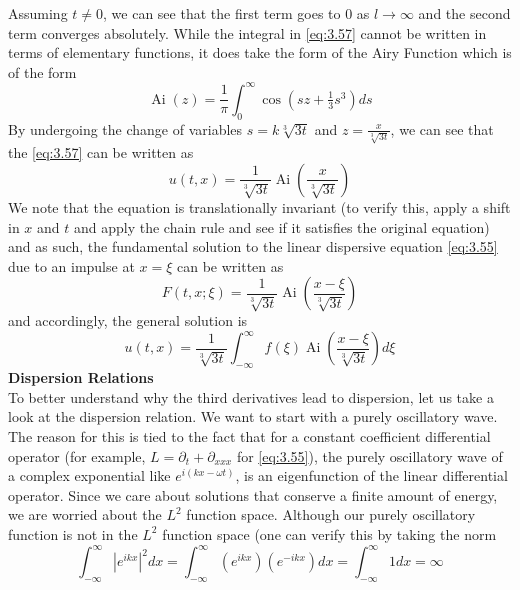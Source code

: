 \documentclass{article}
\numberwithin{equation}{section}
\begin{document}
Assuming $t\neq 0$, we can see that the first term goes to 0 as $l\rightarrow \infty$ and the second term converges absolutely. While the integral in \eqref{eq:3.57} cannot be written in terms of elementary functions, it does take the form of the Airy Function which is of the form
\begin{equation*}
    \operatorname{Ai} (z) = \frac{1}{\pi}\int^\infty_0 \cos(sz+\tfrac{1}{3}s^3)ds
\end{equation*}
By undergoing the change of variables $s=k\sqrt[3]{3t}$ and $z=\frac{x}{\sqrt[3]{3t}}$, we can see that the \eqref{eq:3.57} can be written as 
\begin{equation*}
    u(t,x) = \frac{1}{\sqrt[3]{3t}} \operatorname{Ai}\left( \frac{x}{\sqrt[3]{3t}} \right)
\end{equation*}
We note that the equation is translationally invariant (to verify this, apply a shift in $x$ and $t$ and apply the chain rule and see if it satisfies the original equation) and as such, the fundamental solution to the linear dispersive equation \eqref{eq:3.55} due to an impulse at $x=\xi$ can be written as 
\begin{equation*}
    F(t,x;\xi)=\frac{1}{\sqrt[3]{3t}} \operatorname{Ai}\left( \frac{x-\xi}{\sqrt[3]{3t}} \right)
\end{equation*}
and accordingly, the general solution is 
\begin{equation}
    u(t,x) =\frac{1}{\sqrt[3]{3t}} \int^\infty_{-\infty} f(\xi)\operatorname{Ai}\left( \frac{x-\xi}{\sqrt[3]{3t}} \right) d\xi
\end{equation}
\textbf{Dispersion Relations}\\
To better understand why the third derivatives lead to dispersion, let us take a look at the dispersion relation. We want to start with a purely oscillatory wave. The reason for this is tied to the fact that for a constant coefficient differential operator (for example, $L = \partial_t+\partial_{xxx}$ for \eqref{eq:3.55}), the purely oscillatory wave of a complex exponential like $e^{i(kx-\omega t)}$, is an eigenfunction of the linear differential operator. Since we care about solutions that conserve a finite amount of energy, we are worried about the $L^2$ function space. Although our purely oscillatory function is not in the $L^2$ function space (one can verify this by taking the norm 
\begin{equation*}
    \int^\infty_{-\infty}|e^{ikx}|^2dx = \int^\infty_{-\infty}(e^{ikx})(e^{-ikx})dx = \int^\infty_{-\infty}1dx = \infty
\end{equation*}
\end{document}
